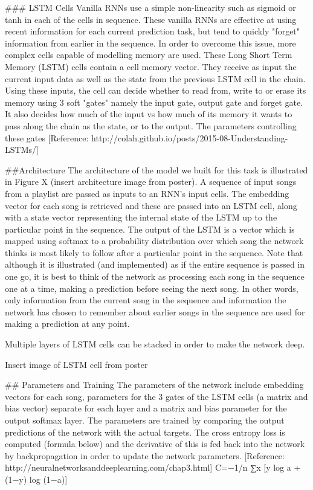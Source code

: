 \documentclass{article} %
\begin{document}
### LSTM Cells
Vanilla RNNs use a simple non-linearity such as sigmoid or tanh in each of the cells in sequence. These vanilla RNNs are effective at using recent information for each current prediction task, but tend to quickly "forget" information from earlier in the sequence. In order to overcome this issue, more complex cells capable of modelling memory are used. These Long Short Term Memory (LSTM) cells contain a cell memory vector. They receive as input the current input data as well as the state from the previous LSTM cell in the chain. Using these inputs, the cell can decide whether to read from, write to or erase its memory using 3 soft "gates" namely the input gate, output gate and forget gate. It also decides how much of the input vs how much of its memory it wants to pass along the chain as the state, or to the output. The parameters controlling these gates 
 [Reference: http://colah.github.io/posts/2015-08-Understanding-LSTMs/]

##Architecture
The architecture of the model we built for this task is illustrated in Figure X (insert architecture image from poster). A sequence of input songs from a playlist are passed as inputs to an RNN's input cells. The embedding vector for each song is retrieved and these are passed into an LSTM cell, along with a state vector representing the internal state of the LSTM up to the particular point in the sequence. The output of the LSTM is a vector which is mapped using softmax to a probability distribution over which song the network thinks is most likely to follow after a particular point in the sequence. Note that although it is illustrated (and implemented) as if the entire sequence is passed in one go, it is best to think of the network as processing each song in the sequence one at a time, making a prediction before seeing the next song. In other words, only information from the current song in the sequence and information the network has chosen to remember about earlier songs in the sequence are used for making a prediction at any point.  

Multiple layers of LSTM cells can be stacked in order to make the network deep. 

Insert image of LSTM cell from poster

## Parameters and Training
The parameters of the network include embedding vectors for each song, parameters for the 3 gates of the LSTM cells (a matrix and bias vector) separate for each layer and a matrix and bias parameter for the output softmax layer. The parameters are trained by comparing the output predictions of the network with the actual targets. The cross entropy loss is computed (formula below) and the derivative of this is fed back into the network by backpropagation in order to update the network parameters. [Reference:  http://neuralnetworksanddeeplearning.com/chap3.html]
C=−1/n ∑x [y log a + (1−y) log (1−a)]  
\end{document}
